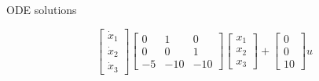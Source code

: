 \documentclass{beamer}
\begin{document}
\begin{frame}{ODE solutions}
\begin{flushleft}

\begin{equation}
    \begin{bmatrix}
    \dot x_1 \\ \dot x_2 \\ \dot x_3
    \end{bmatrix}
    \begin{bmatrix}
    0 & 1 & 0 \\ 0 & 0 & 1 \\ -5 & -10 & -10
    \end{bmatrix}
    \begin{bmatrix}
    x_1 \\ x_2 \\ x_3
    \end{bmatrix}
    +
    \begin{bmatrix}
    0\\ 0 \\ 10
    \end{bmatrix}
    u
\end{equation}


\end{flushleft}
\end{frame}
\end{document}
